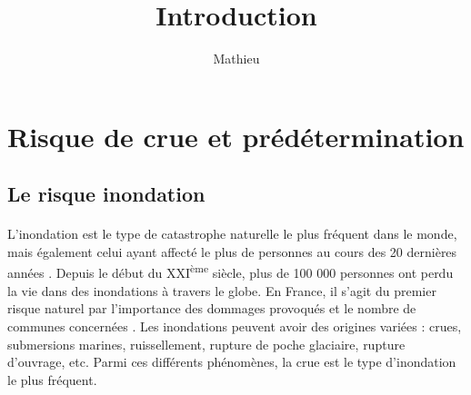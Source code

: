 \documentclass[11pt]{article}
\title{Introduction}
\author{Mathieu}
\begin{document}
\maketitle

\tableofcontents

\newpage

\section{Risque de crue et prédétermination}


	\subsection{Le risque inondation}
	
	\paragraph{} L'inondation est le type de catastrophe naturelle le plus fréquent dans le monde, mais également celui ayant affecté le plus de personnes au cours des 20 dernières années \citep{undrr_human_2020}. Depuis le début du XXI\textsuperscript{ème} siècle, plus de 100 000 personnes ont perdu la vie dans des inondations à travers le globe. En France, il s'agit du premier risque naturel par l'importance des dommages provoqués et le nombre de communes concernées \citep{medd_prevention_2023}. Les inondations peuvent avoir des origines variées : crues, submersions marines, ruissellement, rupture de poche glaciaire, rupture d'ouvrage, etc. Parmi ces différents phénomènes, la crue est le type d'inondation le plus fréquent. 
	
\end{document}
